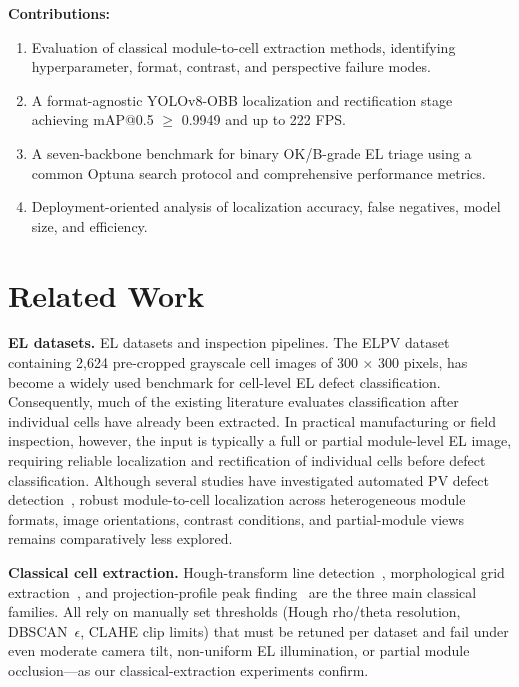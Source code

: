 \documentclass[conference]{IEEEtran}
\begin{document}
\textbf{Contributions:}
\begin{enumerate}
  \item Evaluation of classical module-to-cell extraction methods, identifying hyperparameter, format, contrast, and perspective failure modes.
  \item A format-agnostic YOLOv8-OBB localization and rectification stage achieving mAP@0.5 $\geq$ 0.9949 and up to 222 FPS.
  \item A seven-backbone benchmark for binary OK/B-grade EL triage using a common Optuna search protocol and comprehensive performance metrics.
  \item Deployment-oriented analysis of localization accuracy, false negatives, model size, and efficiency.
\end{enumerate}

\section{Related Work}
\label{sec:related}

\textbf{EL datasets.} EL datasets and inspection pipelines. The ELPV dataset~\cite{deitsch2019} containing 2{,}624 pre-cropped grayscale cell images of 300 × 300 pixels, has become a widely used benchmark for cell-level EL defect classification. Consequently, much of the existing literature evaluates classification after individual cells have already been extracted. In practical manufacturing or field inspection, however, the input is typically a full or partial module-level EL image, requiring reliable localization and rectification of individual cells before defect classification. Although several studies have investigated automated PV defect detection~\cite{zhao2022, su2021, li2023, chen2024, wang2023}, robust module-to-cell localization across heterogeneous module formats, image orientations, contrast conditions, and partial-module views remains comparatively less explored.

\textbf{Classical cell extraction.} Hough-transform line detection~\cite{duda1972}, morphological grid extraction~\cite{soille2003}, and projection-profile peak finding~\cite{wong1982} are the three main classical families. All rely on manually set thresholds (Hough rho/theta resolution, DBSCAN~$\epsilon$, CLAHE clip limits) that must be retuned per dataset and fail under even moderate camera tilt, non-uniform EL illumination, or partial module occlusion---as our classical-extraction experiments confirm.
\end{document}
